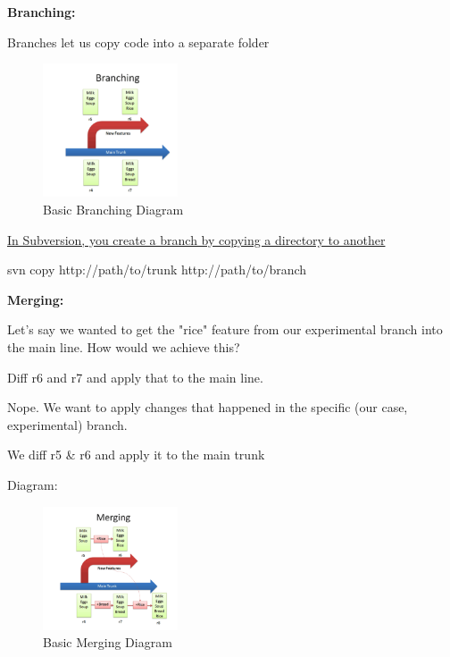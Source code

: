 \documentclass{article}
\begin{document}
\begin{flushleft}
\textbf{Branching:} \\
\par

Branches let us copy code into a separate folder \\
\par

\begin{figure}[htp]
\centering
\includegraphics[width=4cm]{Branching.png}
\caption{Basic Branching Diagram}
\label{fig:BBDiagram}
\end{figure} 

\underline{In Subversion, you create a branch by copying a directory to another} \\
\par

svn copy http://path/to/trunk http://path/to/branch \\
\par

\textbf{Merging:} \\
\par

Let's say we wanted to get the "rice" feature from our experimental branch into the main line. How would we achieve this? \par
Diff r6 and r7 and apply that to the main line. \\
\par

Nope. We want to apply changes that happened in the specific (our case, experimental) branch. \par
We diff r5 \& r6 and apply it to the main trunk \\
\par

Diagram:


\begin{figure}[htp]
\centering
\includegraphics[width=4cm]{Merging.png}
\caption{Basic Merging Diagram}
\label{fig:BMDiagram}
\end{figure} 


\end{flushleft}
\end{document}
